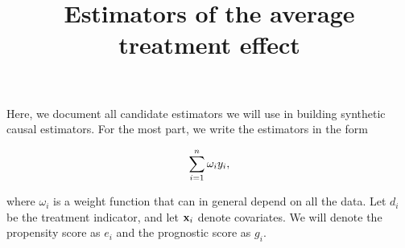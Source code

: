 \documentclass[]{article}
\title{Estimators of the average treatment effect}
\author{}
\date{}
\begin{document}
\maketitle



Here, we document all candidate estimators we will use in building
synthetic causal estimators. For the most part, we write the estimators
in the form

\begin{align*}
\sum_{i=1}^n \omega_i y_i,
\end{align*}

where \(\omega_i\) is a weight function that can in general depend on
all the data. Let \(d_i\) be the treatment indicator, and let \({\bf x}_i\)
denote covariates. We will denote the propensity score as \(e_i\) and
the prognostic score as \(g_i\).
\end{document}
